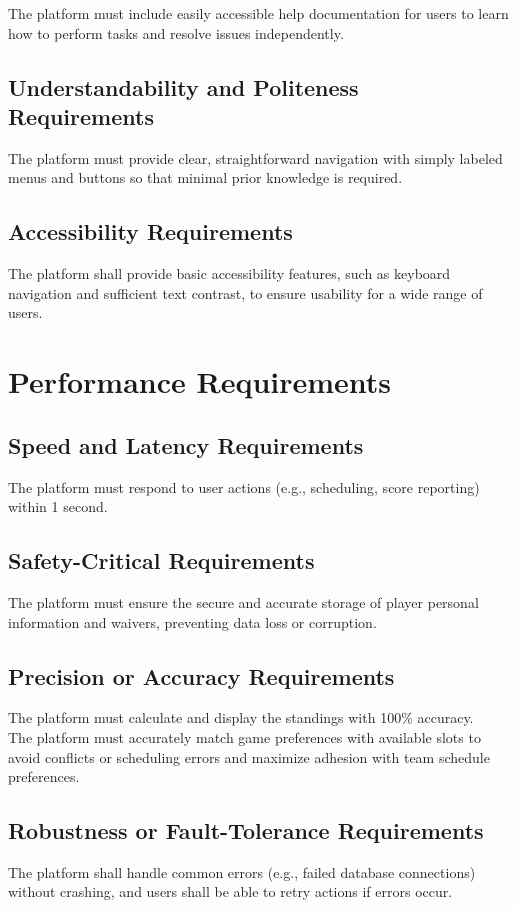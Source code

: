 \documentclass[12pt]{article}
\begin{document}
\noindent The platform must include easily accessible help documentation for users to learn how to perform tasks and resolve issues independently.


\subsection{Understandability and Politeness Requirements}
The platform must provide clear, straightforward navigation with simply labeled menus and buttons so that minimal prior knowledge is required.

\subsection{Accessibility Requirements}
The platform shall provide basic accessibility features, such as keyboard navigation and sufficient text contrast, to ensure usability for a wide range of users.

\section{Performance Requirements}
\subsection{Speed and Latency Requirements}
The platform must respond to user actions (e.g., scheduling, score reporting) within 1 second.

\subsection{Safety-Critical Requirements}
The platform must ensure the secure and accurate storage of player personal information and waivers, preventing data loss or corruption.

\subsection{Precision or Accuracy Requirements}
The platform must calculate and display the standings with 100\% accuracy.\\

\noindent The platform must accurately match game preferences with available slots to avoid conflicts or scheduling errors and maximize adhesion with team schedule preferences.

\subsection{Robustness or Fault-Tolerance Requirements}
The platform shall handle common errors (e.g., failed database connections) without crashing, and users shall be able to retry actions if errors occur.
\end{document}
